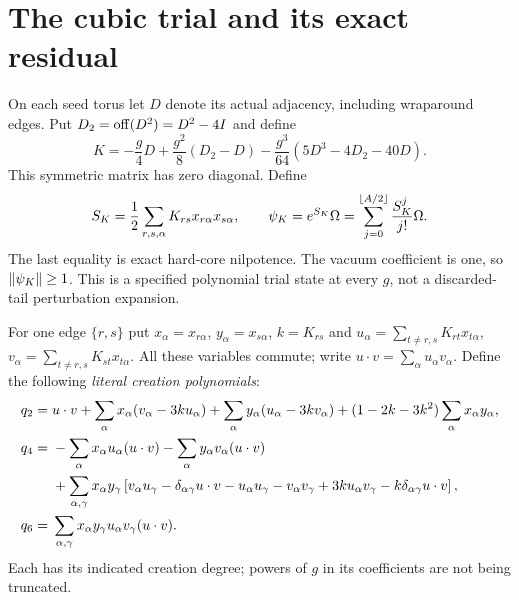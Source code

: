 \section{The cubic trial and its exact residual}\label{sec:trial}
On each seed torus let $D$ denote its actual adjacency, including wraparound
edges. Put $D_2=\operatorname{off}(D^2)=D^2-4I$ and define
\begin{equation}\label{eq:K}
 K=-\frac g4D+\frac{g^2}{8}(D_2-D)
       -\frac{g^3}{64}(5D^3-4D_2-40D).
\end{equation}
This symmetric matrix has zero diagonal. Define
\begin{equation}\label{eq:trial}
 S_K=\frac12\sum_{r,s,\alpha}K_{rs}x_{r\alpha}x_{s\alpha},
 \qquad \psi_K=e^{S_K}\Omega
   =\sum_{j=0}^{\lfloor A/2\rfloor}\frac{S_K^j}{j!}\Omega.
\end{equation}
The last equality is exact hard-core nilpotence. The vacuum coefficient is one,
so $\lVert \psi_K\rVert\ge1$. This is a specified polynomial trial state at every
$g$, not a discarded-tail perturbation expansion.

For one edge $\{r,s\}$ put $x_\alpha=x_{r\alpha}$, $y_\alpha=x_{s\alpha}$,
$k=K_{rs}$ and
$u_\alpha=\sum_{t\ne r,s}K_{rt}x_{t\alpha}$,
$v_\alpha=\sum_{t\ne r,s}K_{st}x_{t\alpha}$. All these variables commute;
write $u\cdot v=\sum_\alpha u_\alpha v_\alpha$. Define the following
\emph{literal creation polynomials}:
\begin{align}\label{eq:q2}
 q_2={}&u\cdot v+\sum_\alpha x_\alpha(v_\alpha-3ku_\alpha)
       +\sum_\alpha y_\alpha(u_\alpha-3kv_\alpha)
       +(1-2k-3k^2)\sum_\alpha x_\alpha y_\alpha,\\
 q_4={}&-\sum_\alpha x_\alpha u_\alpha(u\cdot v)
         -\sum_\alpha y_\alpha v_\alpha(u\cdot v)\notag\\
 &+\sum_{\alpha,\gamma}x_\alpha y_\gamma
 \left[v_\alpha u_\gamma-\delta_{\alpha\gamma}u\cdot v
       -u_\alpha u_\gamma-v_\alpha v_\gamma
       +3ku_\alpha v_\gamma-k\delta_{\alpha\gamma}u\cdot v\right],\label{eq:q4}\\
 q_6={}&\sum_{\alpha,\gamma}x_\alpha y_\gamma
                u_\alpha v_\gamma(u\cdot v).\label{eq:q6}
\end{align}
Each has its indicated creation degree; powers of $g$ in its coefficients are
not being truncated.

